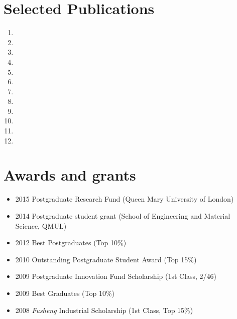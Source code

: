 \documentclass[letterpaper]{article}
\def\name{Yang Wang}
\begin{document}
\vspace{-12pt}
\section*{Selected Publications}
\vspace{-10pt}





\begin{enumerate}
\item {}
\item {}
\item {}
\item {}
\item {}
\item {}
\item {}
\item {}
\item {}
\item {}
\item {}
\item {}

\end{enumerate}


\vspace{-12pt}
\section*{Awards and grants}
\vspace{-10pt}
\begin{itemize}
\item 2015 Postgraduate Research Fund (Queen Mary University of London)
\item 2014 Postgraduate student grant (School of Engineering and Material Science, QMUL)
\item 2012 Best Postgraduates (Top 10\%)
\item 2010 Outstanding Postgraduate Student Award (Top 15\%)
\item 2009 Postgraduate Innovation Fund Scholarship (1st Class, 2/46)
\item 2009 Best Graduates (Top 10\%)
\item 2008 \textsl{Fusheng} Industrial Scholarship (1st Class, Top 15\%)
\end{itemize}
\end{document}

